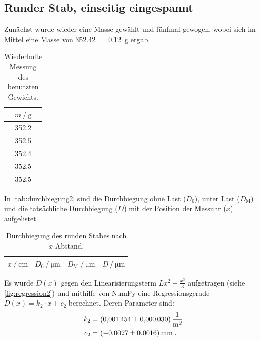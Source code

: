 \subsection{Runder Stab, einseitig eingespannt} \label{sec:auswertung_einseitig_rund}
Zunächst wurde wieder eine Masse gewählt und fünfmal gewogen,
wobei sich im Mittel eine Masse von \SI{352.42 \pm 0.12}{\gram} ergab.

\begin{table}
\centering
\caption{Wiederholte Messung des benutzten Gewichts.}
\begin{tabular}{c}
\toprule
$m \mathbin{/} \si{\gram}$ \\
\midrule
\num{352.2} \\
\num{352.5} \\
\num{352.4} \\
\num{352.5} \\
\num{352.5} \\
\bottomrule
\end{tabular}
\end{table}


In \autoref{tab:durchbiegung2} sind die Durchbiegung ohne Last ($D_\text{0}$), unter Last ($D_\text{M}$) und die tatsächliche Durchbiegung ($D$) mit der Position der Messuhr ($x$) aufgelistet.

\begin{table}
\centering
\caption{Durchbiegung des runden Stabes nach $x$-Abstand.}
\label{tab:durchbiegung2}
\begin{tabular}{c c c c}
\toprule
$x \mathbin{/} \si{\centi\meter}$ &
$D_0 \mathbin{/} \si{\micro\meter}$ &
$D_\text{M} \mathbin{/} \si{\micro\meter}$ &
$D \mathbin{/} \si{\micro\meter}$ \\
\midrule

\bottomrule
\end{tabular}
\end{table}

\FloatBarrier

Es wurde $D(x)$ gegen den Linearisierungsterm $Lx^2-\frac{x^3}{3}$ aufgetragen (siehe \autoref{fig:regression2})
und mithilfe von NumPy eine Regressionsgerade $D(x) = k_2 \cdot x + c_2$ berechnet.
Deren Parameter sind:
\begin{align*}
  k_2 &= \SI{0.001454 \pm 0.000030}{\meter\tothe{-2}} \\
  c_2 &= \SI{-0.0027 \pm 0.0016}{\milli\meter} \; .
\end{align*}

